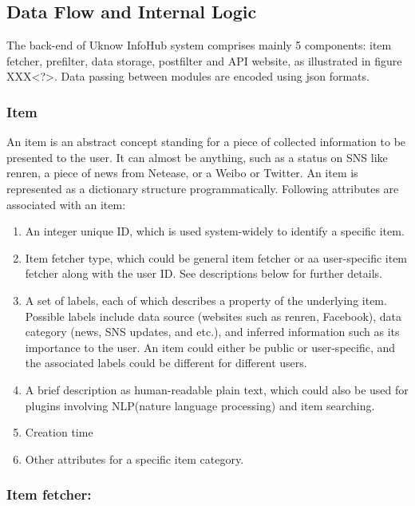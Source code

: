 \subsection{Data Flow and Internal Logic}

The back-end of Uknow InfoHub system comprises mainly 5 components: item
fetcher, prefilter, data storage, postfilter and API website, as
illustrated in figure XXX\textless{}?\textgreater{}. Data passing
between modules are encoded using json formats.

\subsubsection{Item}

An item is an abstract concept standing for a piece of collected
information to be presented to the user. It can almost be anything, such
as a status on SNS like renren, a piece of news from Netease, or a Weibo
or Twitter. An item is represented as a dictionary structure
programmatically. Following attributes are associated with an item:

\begin{enumerate}
\def\labelenumi{\arabic{enumi}.}
\itemsep1pt\parskip0pt
\item
  An integer unique ID, which is used system-widely to identify a
  specific item.
\item
  Item fetcher type, which could be general item fetcher or aa
  user-specific item fetcher along with the user ID. See descriptions
  below for further details.
\item
  A set of labels, each of which describes a property of the underlying
  item. Possible labels include data source (websites such as renren,
  Facebook), data category (news, SNS updates, and etc.), and inferred
  information such as its importance to the user. An item could either
  be public or user-specific, and the associated labels could be
  different for different users.
\item
  A brief description as human-readable plain text, which could also be
  used for plugins involving NLP(nature language processing) and item
  searching.
\item
  Creation time
\item
  Other attributes for a specific item category.
\end{enumerate}

\subsubsection{Item fetcher:}

